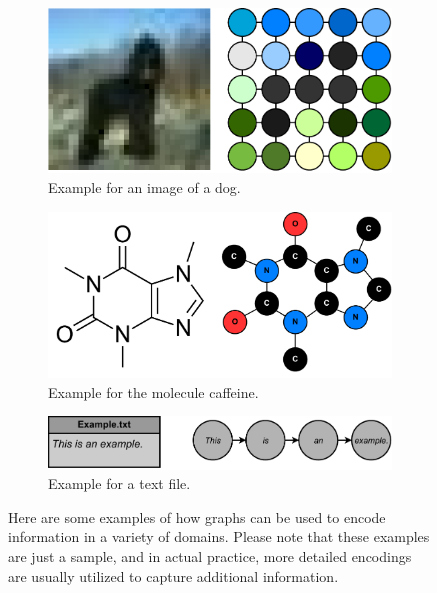 \begin{figure}
 \centering
 \begin{subfigure}[b]{0.475\textwidth}
    \centering
    \includegraphics[width=\textwidth]{Figures/Example_Encoding_Image.pdf}
    \caption{Example for an image of a dog.\footnotemark}
 \end{subfigure}
 \hfill
 \begin{subfigure}[b]{0.475\textwidth}
    \centering
    \includegraphics[width=\textwidth]{Figures/Example_Encoding_Molecule.pdf}
    \caption{Example for the molecule caffeine.\footnotemark}
 \end{subfigure}
 \par\medskip
 \begin{subfigure}[b]{0.475\textwidth}
    \centering
    \includegraphics[width=\textwidth]{Figures/Example_Encoding_Text.pdf}
    \caption{Example for a text file.}
 \end{subfigure}
 \caption[Caption for LOF]{Here are some examples of how graphs can be used to encode information in a variety of domains. Please note that these examples are just a sample, and in actual practice, more detailed encodings are usually utilized to capture additional information.\footnotemark}
 \label{fig:example_encodings}
\end{figure}


